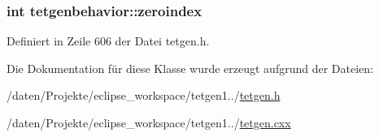 \hypertarget{classtetgenbehavior_a8fdd3e7c5d8ac46e72071888e6890eeb}{
\subsubsection[{zeroindex}]{\setlength{\rightskip}{0pt plus 5cm}int tetgenbehavior\-::zeroindex}}\label{classtetgenbehavior_a8fdd3e7c5d8ac46e72071888e6890eeb}


Definiert in Zeile 606 der Datei tetgen.\-h.



Die Dokumentation für diese Klasse wurde erzeugt aufgrund der Dateien\-:\begin{DoxyCompactItemize}
\item 
/daten/\-Projekte/eclipse\-\_\-workspace/tetgen1../\hyperlink{tetgen_8h}{tetgen.\-h}\item 
/daten/\-Projekte/eclipse\-\_\-workspace/tetgen1../\hyperlink{tetgen_8cxx}{tetgen.\-cxx}\end{DoxyCompactItemize}
